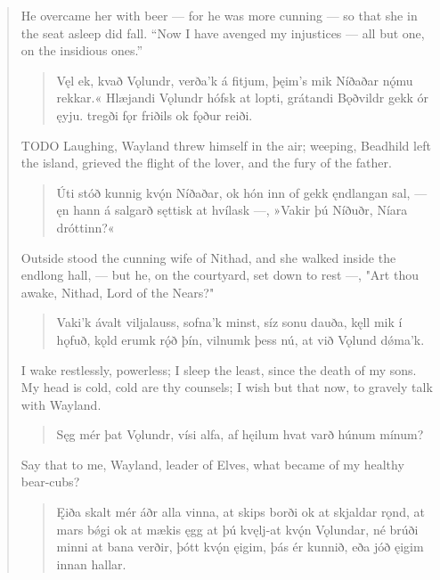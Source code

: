 \begin{verse}
\bvb He overcame her with beer — for he was more cunning — so that she in the seat asleep did fall. “Now I have avenged my injustices — all but one, on the insidious ones.”

\begin{verse}
\bva Vęl ek, kvað Vǫlundr, \hld verða’k á fitjum,
þęim’s mik Níðaðar \hld nǫ́mu rekkar.« 
Hlæjandi Vǫlundr \hld hófsk at lopti,
grátandi Bǫðvildr \hld gekk ór ęyju.
tregði fǫr friðils \hld ok fǫður reiði. \\%
\end{verse}

\bvb TODO Laughing, Wayland threw himself in the air; weeping, Beadhild left the island, grieved the flight of the lover, and the fury of the father.

\begin{verse}
\bva Úti stóð kunnig \hld kvǫ́n Níðaðar,
ok hón inn of gekk \hld ęndlangan sal,
— ęn hann á salgarð \hld sęttisk at hvílask —,
»Vakir þú Níðuðr, \hld Níara dróttinn?«  \\%
\end{verse}

\bvb Outside stood the cunning wife of Nithad, and she walked inside the endlong hall, — but he, on the courtyard, set down to rest —, "Art thou awake, Nithad, Lord of the Nears?"

\begin{verse}
\bva Vaki'k ávalt \hld viljalauss,
sofna'k minst, \hld síz sonu dauða,
kęll mik í hǫfuð, \hld kǫld erumk rǫ́ð þín,
vilnumk þess nú, \hld at við Vǫlund dǿma'k. \\%
\end{verse}

\bvb I wake restlessly, powerless; I sleep the least, since the death of my sons. My head is cold, cold are thy counsels; I wish but that now, to gravely talk with Wayland.

\begin{verse}
\bva Sęg mér þat Vǫlundr, \hld vísi alfa,
af hęilum hvat varð \hld húnum mínum? \\%
\end{verse}

\bvb Say that to me, Wayland, leader of Elves, what became of my healthy bear-cubs?

\begin{verse}
\bva Ęiða skalt mér áðr \hld alla vinna,
at skips borði \hld ok at skjaldar rǫnd,
at mars bǿgi \hld ok at mækis ęgg
at þú kvęlj-at \hld kvǫ́n Vǫlundar,
né brúði minni \hld at bana verðir,
þótt kvǫ́n ęigim, \hld þás ér kunnið,
eða jóð ęigim \hld innan hallar. \\%
\end{verse}


\end{verse}
